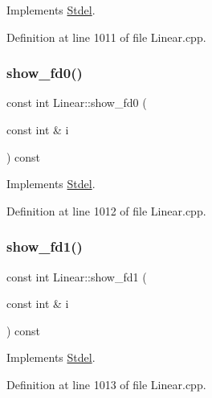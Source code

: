 Implements \hyperlink{classStdel_ae76b0893dabd93ae9f86a9ed445852ba}{Stdel}.



Definition at line 1011 of file Linear.\+cpp.

\mbox{\label{classLinear_a1bbad0d40ac2e1d16097e1510ce19c07}} 
\subsubsection{\texorpdfstring{show\+\_\+fd0()}{show\_fd0()}}
{\footnotesize\ttfamily const int Linear\+::show\+\_\+fd0 (\begin{DoxyParamCaption}\item[{const int \&}]{i }\end{DoxyParamCaption}) const\hspace{0.3cm}{\ttfamily [virtual]}}



Implements \hyperlink{classStdel_a0e05ccae64925915af5f07c91d61c7bc}{Stdel}.



Definition at line 1012 of file Linear.\+cpp.

\mbox{\label{classLinear_a8c97f726b71671ed6eac8ef83e136a04}} 
\subsubsection{\texorpdfstring{show\+\_\+fd1()}{show\_fd1()}}
{\footnotesize\ttfamily const int Linear\+::show\+\_\+fd1 (\begin{DoxyParamCaption}\item[{const int \&}]{i }\end{DoxyParamCaption}) const\hspace{0.3cm}{\ttfamily [virtual]}}



Implements \hyperlink{classStdel_af4a394fae421489159f40ddcb736353b}{Stdel}.



Definition at line 1013 of file Linear.\+cpp.

\mbox{\label{classLinear_aa0fe8dfc164afda4e30551322de7984e}} 
